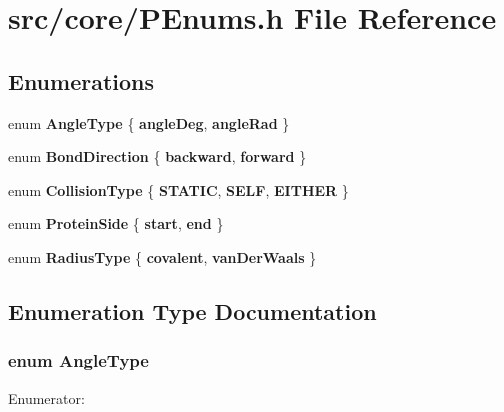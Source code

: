 \section{src/core/PEnums.h File Reference}
\label{PEnums_8h}


\subsection*{Enumerations}
\begin{CompactItemize}
\item 
enum {\bf Angle\-Type} \{ {\bf angle\-Deg}, 
{\bf angle\-Rad}
 \}
\item 
enum {\bf Bond\-Direction} \{ {\bf backward}, 
{\bf forward}
 \}
\item 
enum {\bf Collision\-Type} \{ {\bf STATIC}, 
{\bf SELF}, 
{\bf EITHER}
 \}
\item 
enum {\bf Protein\-Side} \{ {\bf start}, 
{\bf end}
 \}
\item 
enum {\bf Radius\-Type} \{ {\bf covalent}, 
{\bf van\-Der\-Waals}
 \}
\end{CompactItemize}


\subsection{Enumeration Type Documentation}
\subsubsection{\setlength{\rightskip}{0pt plus 5cm}enum {\bf Angle\-Type}}\label{PEnums_8h_0bef1de5816813e7b6d93b9145eef75d}


\begin{Desc}
\item[Enumerator: ]\par
\begin{description}
\item[{\em 
angle\-Deg\label{PEnums_8h_0bef1de5816813e7b6d93b9145eef75d143b942878042e1c6caa65ce834c6fd0}
}]\item[{\em 
angle\-Rad\label{PEnums_8h_0bef1de5816813e7b6d93b9145eef75d083e317c3401e3493a792643af599e0a}
}]\end{description}
\end{Desc}

